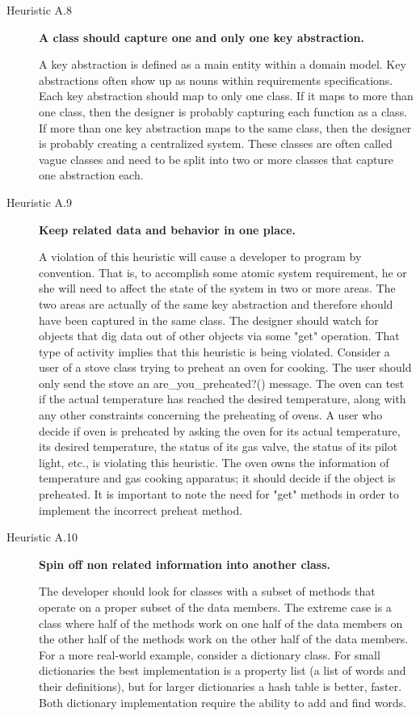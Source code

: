 \begin{description}
\item[Heuristic A.8] \textbf{A class should capture one and only one key abstraction.}

A key abstraction is defined as a main entity within a domain model. Key abstractions often show up as nouns within requirements specifications. Each key abstraction should map to only one class. If it maps to more than one class, then the designer is probably capturing each function as a class. If more than one key abstraction maps to the same class, then the designer is probably creating a centralized system. These classes are often called vague classes and need to be split into two or more classes that capture one abstraction each.


\item[Heuristic A.9] \textbf{Keep related data and behavior in one place.}

A violation of this heuristic will cause a developer to program by convention. That is, to accomplish some atomic system requirement, he or she will need to affect the state of the system in two or more areas. The two areas are actually of the same key abstraction and therefore should have been captured in the same class. The designer should watch for objects that dig data out of other objects via some "get" operation. That type of activity implies that this heuristic is being violated. Consider a user of a stove class trying to preheat an oven for cooking. The user should only send the stove an are\_you\_preheated?() message. The oven can test if the actual temperature has reached the desired temperature, along with any other constraints concerning the preheating of ovens. A user who decide if oven is preheated by asking the oven for its actual temperature, its desired temperature, the status of its gas valve, the status of its pilot light, etc., is violating this heuristic. The oven owns the information of temperature and gas cooking apparatus; it should decide if the object is preheated. It is important to note the need for "get" methods in order to implement the incorrect preheat method.

\item[Heuristic A.10] \textbf{Spin off non related information into another class.}

The developer should look for classes with a subset of methods that operate on a proper subset of the data members. The extreme case is a class where half of the methods work on one half of the data members on the other half of the methods work on the other half of the data members. For a more real-world example, consider a dictionary class. For small dictionaries the best implementation is a property list (a list of words and their definitions), but for larger dictionaries a hash table is better, faster. Both dictionary implementation require the ability to add and find words.

\end{description}



